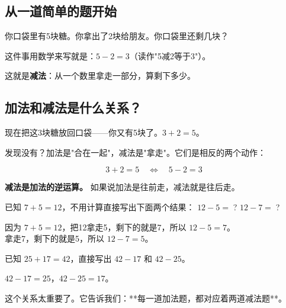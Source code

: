 

\subsection*{从一道简单的题开始}

你口袋里有5块糖。你拿出了2块给朋友。你口袋里还剩几块？

这件事用数学来写就是：$5-2=3$（读作"5减2等于3"）。

这就是\textbf{减法}：从一个数里拿走一部分，算剩下多少。

\subsection*{加法和减法是什么关系？}

现在把这3块糖放回口袋——你又有5块了。$3+2=5$。

发现没有？加法是"合在一起"，减法是"拿走"。它们是相反的两个动作：

\[
3+2=5 \quad\Longleftrightarrow\quad 5-2=3
\]

\textbf{减法是加法的逆运算。} 如果说加法是往前走，减法就是往后走。

\begin{example}
已知 $7+5=12$，不用计算直接写出下面两个结果：
$12-5=\;$? \qquad $12-7=\;$?
\end{example}
\begin{solution}
因为 $7+5=12$，把12拿走5，剩下的就是7，所以 $12-5=7$。\\
拿走7，剩下的就是5，所以 $12-7=5$。
\end{solution}

\begin{example}
已知 $25+17=42$，直接写出 $42-17$ 和 $42-25$。
\end{example}
\begin{solution}
$42-17=25$，$42-25=17$。
\end{solution}

这个关系太重要了。它告诉我们：**每一道加法题，都对应着两道减法题**。

